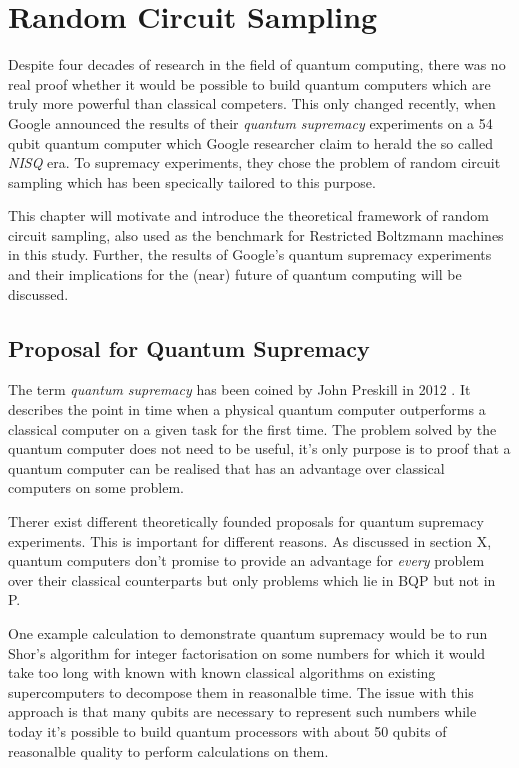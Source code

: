 \chapter{Random Circuit Sampling}

Despite four decades
of research in the field of quantum computing, 
there was no real proof whether it would be possible to build quantum computers
which are truly more powerful than classical competers. This only changed
recently, when Google announced the results of their \textit{quantum supremacy}
experiments on a 54 qubit quantum computer which Google researcher claim to herald the so called
\textit{NISQ} era. To supremacy experiments, they
chose the problem of random circuit sampling which has been specically tailored
to this purpose.

This chapter will motivate and introduce the theoretical framework of random circuit
sampling, also used as the benchmark for Restricted Boltzmann machines in this
study. Further, the results of Google's quantum supremacy experiments and their
implications for the (near) future of quantum computing will be discussed.

\section{Proposal for Quantum Supremacy}

The term \textit{quantum supremacy} has been coined by John Preskill in 2012
\cite{}. It describes the point in time when a physical quantum computer
outperforms a classical computer on a given task for the first time. The problem
solved by the quantum computer does not need to be useful, it's only purpose is
to proof that a quantum computer can be realised that has an advantage over
classical computers on some problem.

Therer exist different theoretically founded proposals for quantum supremacy
experiments. This is important for different reasons. As discussed in section X,
quantum computers don't promise to provide an advantage for \textit{every}
problem over their classical counterparts but only problems which lie in BQP but
not in P.

One example calculation to demonstrate quantum supremacy would be to run Shor's
algorithm for integer factorisation on some numbers for which it would take too
long with known with known classical algorithms on existing supercomputers to
decompose them in reasonalble time. The issue with this approach is that many
qubits are necessary to represent such numbers while today it's possible to
build quantum processors with about 50 qubits of reasonalble quality to perform
calculations on them.

